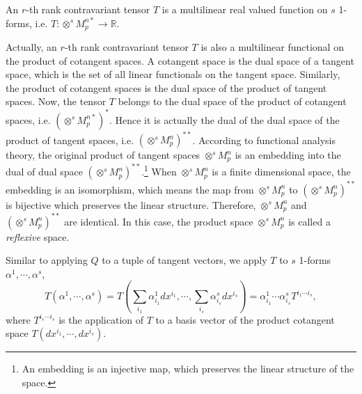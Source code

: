 \documentclass[11pt, a4paper]{book}
\begin{document}
\begin{Definition}
  An $r$-th rank contravariant tensor $T$ is a multilinear real valued function on $s$
  1-forms, i.e. $T: \otimes^s M_p^{n*} \rightarrow \mathbb{R}$.
\end{Definition}
Actually, an $r$-th rank contravariant tensor $T$ is also a multilinear functional on the
product of cotangent spaces. A cotangent space is the dual space of a tangent space, which
is the set of all linear functionals on the tangent space. Similarly, the product of
cotangent spaces is the dual space of the product of tangent spaces. Now, the tensor $T$
belongs to the dual space of the product of cotangent spaces, i.e.
$\left( \otimes^s M_p^{n*} \right)^{*}$. Hence it is actually the dual of the dual space
of the product of tangent spaces, i.e. $\left( \otimes^s M_p^n \right)^{**}$. According to
functional analysis theory, the original product of tangent spaces $\otimes^s M_p^n$ is an
embedding into the dual of dual space $\left( \otimes^s M_p^n \right)^{**}$.\footnote{An
  embedding is an injective map, which preserves the linear structure of the space.} When
$\otimes^s M_p^n$ is a finite dimensional space, the embedding is an isomorphism, which
means the map from $\otimes^s M_p^n$ to $\left( \otimes^s M_p^n \right)^{**}$ is bijective
which preserves the linear structure. Therefore, $\otimes^s M_p^n$ and
$\left( \otimes^s M_p^n \right)^{**}$ are identical. In this case, the product space
$\otimes^s M_p^n$ is called a \emph{reflexive} space.

Similar to applying $Q$ to a tuple of tangent vectors, we apply $T$ to $s$ 1-forms
$\alpha^1,\cdots,\alpha^s$,
\begin{equation}
  \label{eq:contravariant-tensor-applied-to-s-1-forms}
  T(\alpha^1,\cdots,\alpha^s) = T(\sum_{i_1}\alpha_{i_1}^1 dx^{i_1}, \cdots,
  \sum_{i_s}\alpha_{i_s}^s dx^{i_s}) = \alpha_{i_1}^1\cdots\alpha_{i_s}^s T^{i_1 \cdots i_s},
\end{equation}
where $T^{i_s\cdots i_s}$ is the application of $T$ to a basis vector of the product
cotangent space $T(dx^{i_1},\cdots,dx^{i_s})$.
\end{document}
